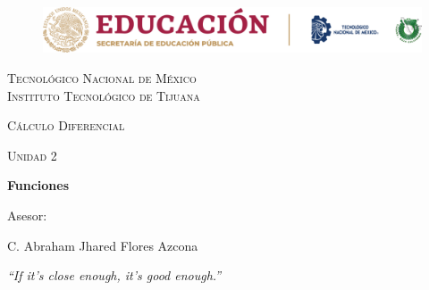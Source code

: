 \documentclass[letterpaper, 12pt]{article}
\begin{document}
    
    \begin{titlepage}
        \begin{figure}[ht]
            \centering
            \includegraphics[width=15cm]{logosITT.png}
        \end{figure}
        \centering
        {\scshape\LARGE Tecnológico Nacional de México\\Instituto Tecnológico de Tijuana\par}
        \vspace{1cm}
        {\scshape\Large Cálculo Diferencial\par}
        \vspace{1cm}
        {\scshape\Large Unidad 2\par}
        \vspace{1.5cm}
        {\huge\bfseries Funciones\par}
        \vfill
        Asesor: \par
        C. Abraham Jhared Flores Azcona
        
        \vfill

        {\large \emph{``If it's close enough, it's good enough.''}}


    \end{titlepage}

    \newpage
        \pagestyle{empty}
        \tableofcontents
        \listoffigures

        \newpage
        \pagestyle{fancy}
\end{document}
